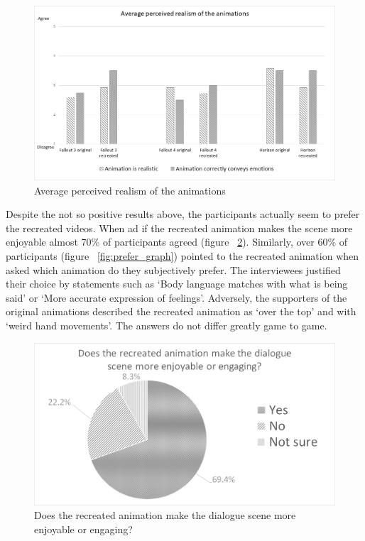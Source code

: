 \begin{figure}[!ht]
	\centerline{\includegraphics[width = 42em]{img/results/realism.png}}
	\caption{Average perceived realism of the animations}\label{fig:realism_graph}
\end{figure}



Despite the not so positive results above, the participants actually seem to prefer the recreated videos. When ad if the recreated animation makes the scene more enjoyable almost 70\% of participants agreed (figure ~\ref{fig:improves_graph}). Similarly, over 60\% of participants (figure ~\ref{fig:prefer_graph}) pointed to the recreated animation when asked which animation do they subjectively prefer. The interviewees justified their choice by statements such as `Body language matches with what is being said' or `More accurate expression of feelings'. Adversely, the supporters of the original animations described the recreated animation as `over the top' and with `weird hand movements'. The answers do not differ greatly game to game.

\begin{figure}[!ht]
	\centerline{\includegraphics[width = 42em]{img/results/improves.png}}
	\caption{Does the recreated animation make the dialogue scene more enjoyable or engaging?}\label{fig:improves_graph}
\end{figure}

